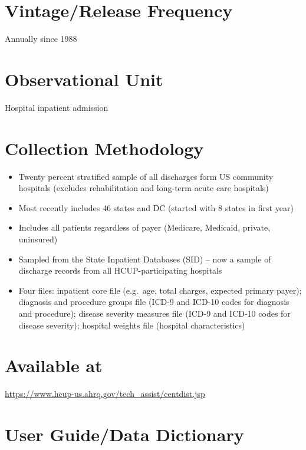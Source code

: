 \documentclass[
]{book}
\providecommand{\tightlist}{%
  \setlength{\itemsep}{0pt}\setlength{\parskip}{0pt}}
\begin{document}
\hypertarget{vintagerelease-frequency-55}{%
\section{Vintage/Release Frequency}\label{vintagerelease-frequency-55}}

Annually since 1988

\hypertarget{observational-unit-55}{%
\section{Observational Unit}\label{observational-unit-55}}

Hospital inpatient admission

\hypertarget{collection-methodology-55}{%
\section{Collection Methodology}\label{collection-methodology-55}}

\begin{itemize}
\tightlist
\item
  Twenty percent stratified sample of all discharges form US community hospitals (excludes rehabilitation and long-term acute care hospitals)
\item
  Most recently includes 46 states and DC (started with 8 states in first year)
\item
  Includes all patients regardless of payer (Medicare, Medicaid, private, uninsured)
\item
  Sampled from the State Inpatient Databases (SID) -- now a sample of discharge records from all HCUP-participating hospitals
\item
  Four files: inpatient core file (e.g.~age, total charges, expected primary payer); diagnosis and procedure groups file (ICD-9 and ICD-10 codes for diagnosis and procedure); disease severity measures file (ICD-9 and ICD-10 codes for disease severity); hospital weights file (hospital characteristics)
\end{itemize}

\hypertarget{available-at-55}{%
\section{Available at}\label{available-at-55}}

\url{https://www.hcup-us.ahrq.gov/tech_assist/centdist.jsp}

\hypertarget{user-guidedata-dictionary-55}{%
\section{User Guide/Data Dictionary}\label{user-guidedata-dictionary-55}}
\end{document}
